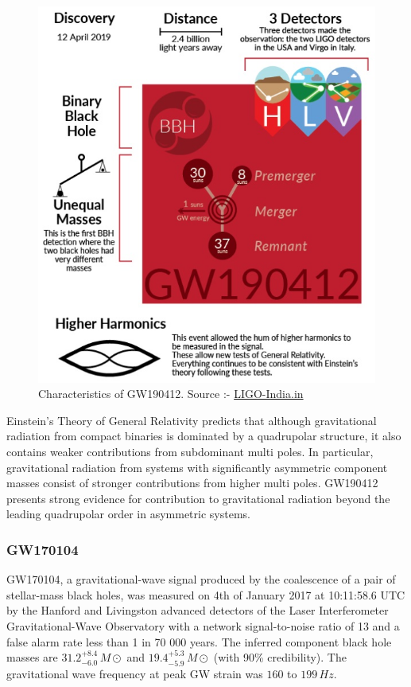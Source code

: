 \begin{figure}[h]
    \centering
    \includegraphics[scale=1.15]{images.tex/GW190412.jpg}
    \caption{Characteristics of GW190412. Source :- \href{https://www.ligo-india.in/outreach/detections/gw190412/}{LIGO-India.in}}
\end{figure}

Einstein’s Theory of General Relativity predicts that although gravitational radiation from compact binaries is dominated by a quadrupolar structure, it also contains weaker contributions from subdominant multi poles. In particular, gravitational radiation from systems with significantly asymmetric component masses consist of stronger contributions from higher multi poles. GW190412 presents strong evidence for contribution to gravitational radiation beyond the leading quadrupolar order in asymmetric systems.

\pagebreak

\subsubsection{GW170104}

GW170104, a gravitational-wave signal produced by the coalescence of a pair of stellar-mass black holes, was measured on 4th of January 2017 at 10:11:58.6 UTC by the Hanford and Livingston advanced detectors of the Laser Interferometer Gravitational-Wave Observatory with a network signal-to-noise ratio of 13 and a false alarm rate less than 1 in 70 000 years. The inferred component black hole masses are $31.2^{+8.4}_{-6.0}\,M\odot$  and $19.4^{+5.3}_{-5.9}\,M\odot$ (with 90\% credibility). The gravitational wave frequency at peak GW strain was $160$ to $199\, Hz$. \cite{PhysRevLett.118.221101}

